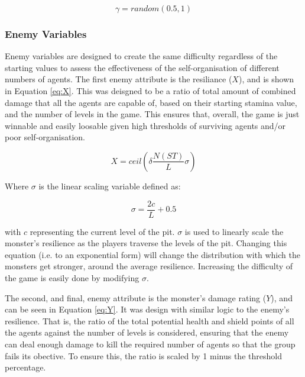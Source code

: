 \begin{equation}
    \gamma = random(0.5,1)
\end{equation}


\subsubsection{Enemy Variables}\label{sec: enemy}


Enemy variables are designed to create the same difficulty regardless of the starting values to assess the effectiveness of the self-organisation of different numbers of agents. The first enemy attribute is the resiliance ($X$), and is shown in Equation \ref{eq:X}. This was deisgned to be a ratio of total amount of combined damage that all the agents are capable of, based on their starting stamina value, and the number of levels in the game. This ensures that, overall, the game is just winnable and easily loosable given high thresholds of surviving agents and/or poor self-organisation. 

\begin{equation}\label{eq:X}
    X = ceil \left( \delta \frac{N(ST)}{L} \sigma \right)
\end{equation}

Where $\sigma$ is the linear scaling variable defined as:

\begin{equation}
    \sigma = \frac{2c}{L} + 0.5
\end{equation}

with $c$ representing the current level of the pit. $\sigma$ is used to linearly scale the monster's resilience as the players traverse the levels of the pit. Changing this equation (i.e. to an exponential form) will change the distribution with which the monsters get stronger, around the average resilience. Increasing the difficulty of the game is easily done by modifying $\sigma$.

The second, and final, enemy attribute is the monster's damage rating ($Y$), and can be seen in Equation \ref{eq:Y}. It was design with similar logic to the enemy's resilience. That is, the ratio of the total potential health and shield points of all the agents against the number of levels is considered, ensuring that the enemy can deal enough damage to kill the required number of agents so that the group fails its obective. To ensure this, the ratio is scaled by 1 minus the threshold percentage.  

